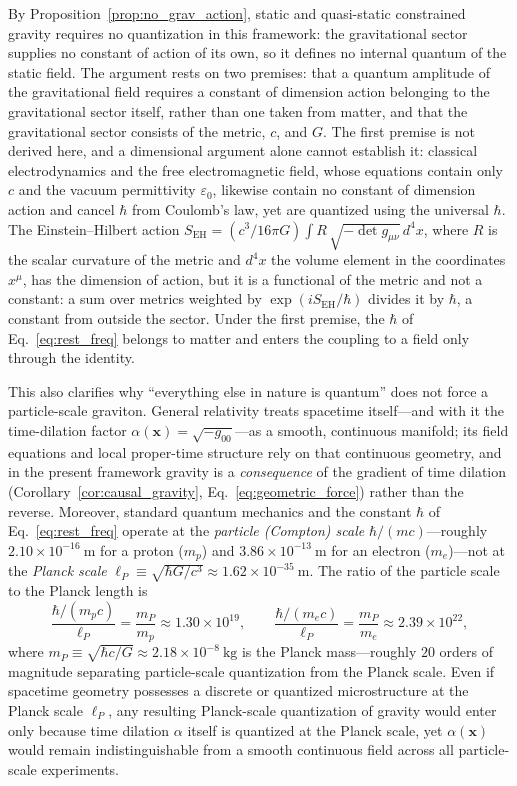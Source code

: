 \documentclass[aps,prd,onecolumn,tightenlines,nofootinbib,notitlepage,11pt,floatfix]{revtex4-2}
\theoremstyle{indentedtheorem}
\begin{document}
By Proposition~\ref{prop:no_grav_action}, static and quasi-static constrained gravity requires no quantization in this framework: the gravitational sector supplies no constant of action of its own, so it defines no internal quantum of the static field. The argument rests on two premises: that a quantum amplitude of the gravitational field requires a constant of dimension action belonging to the gravitational sector itself, rather than one taken from matter, and that the gravitational sector consists of the metric, $c$, and $G$. The first premise is not derived here, and a dimensional argument alone cannot establish it: classical electrodynamics and the free electromagnetic field, whose equations contain only $c$ and the vacuum permittivity $\varepsilon_0$, likewise contain no constant of dimension action and cancel $\hbar$ from Coulomb's law, yet are quantized using the universal $\hbar$. The Einstein--Hilbert action $S_\text{EH}=(c^3/16\pi G)\int R\,\sqrt{-\det g_{\mu\nu}}\,d^4x$, where $R$ is the scalar curvature of the metric and $d^4x$ the volume element in the coordinates $x^\mu$, has the dimension of action, but it is a functional of the metric and not a constant: a sum over metrics weighted by $\exp(iS_\text{EH}/\hbar)$ divides it by $\hbar$, a constant from outside the sector. Under the first premise, the $\hbar$ of Eq.~\eqref{eq:rest_freq} belongs to matter and enters the coupling to a field only through the identity.

This also clarifies why ``everything else in nature is quantum'' does not force a particle-scale graviton. General relativity treats spacetime itself—and with it the time-dilation factor $\alpha(\mathbf{x})=\sqrt{-g_{00}}$—as a smooth, continuous manifold; its field equations and local proper-time structure rely on that continuous geometry, and in the present framework gravity is a \emph{consequence} of the gradient of time dilation (Corollary~\ref{cor:causal_gravity}, Eq.~\eqref{eq:geometric_force}) rather than the reverse. Moreover, standard quantum mechanics and the constant $\hbar$ of Eq.~\eqref{eq:rest_freq} operate at the \emph{particle (Compton) scale} $\hbar/(mc)$—roughly $2.10\times 10^{-16}~\text{m}$ for a proton ($m_p$) and $3.86\times 10^{-13}~\text{m}$ for an electron ($m_e$)—not at the \emph{Planck scale} $\ell_P\equiv\sqrt{\hbar G/c^3}\approx 1.62\times 10^{-35}~\text{m}$. The ratio of the particle scale to the Planck length is
\begin{equation}
    \frac{\hbar/(m_p c)}{\ell_P} = \frac{m_P}{m_p} \approx 1.30\times 10^{19} , \qquad \frac{\hbar/(m_e c)}{\ell_P} = \frac{m_P}{m_e} \approx 2.39\times 10^{22} ,
    \label{eq:compton_planck_ratio}
\end{equation}
where $m_P\equiv\sqrt{\hbar c/G}\approx 2.18\times 10^{-8}~\text{kg}$ is the Planck mass—roughly $20$ orders of magnitude separating particle-scale quantization from the Planck scale. Even if spacetime geometry possesses a discrete or quantized microstructure at the Planck scale $\ell_P$, any resulting Planck-scale quantization of gravity would enter only because time dilation $\alpha$ itself is quantized at the Planck scale, yet $\alpha(\mathbf{x})$ would remain indistinguishable from a smooth continuous field across all particle-scale experiments.
\end{document}
